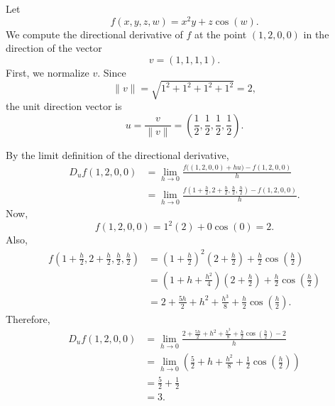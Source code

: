 	\begin{example}
	  \label{ex:directional-derivative-in-four-variables}
		Let
		\begin{equation}
			f(x,y,z,w) = x^2y + z\cos(w).
		\end{equation}
		We compute the directional derivative of $f$ at the point $(1,2,0,0)$ in the direction of the vector
		\begin{equation}
		  v=(1,1,1,1).
		\end{equation}
		First, we normalize $v$. Since
		\begin{equation}
			\|v\|
			=
			\sqrt{1^2+1^2+1^2+1^2}
			=
			2,
		\end{equation}
		the unit direction vector is
		\begin{equation}
			u = \frac{v}{\|v\|}
			=
			\left(\frac{1}{2}, \frac{1}{2}, \frac{1}{2}, \frac{1}{2}\right).
		\end{equation}

		By the limit definition of the directional derivative,
		\begin{align}
			D_u f(1,2,0,0)
			&=
			\lim_{h\to 0}
			\frac{f\big((1,2,0,0)+hu\big)-f(1,2,0,0)}{h} \\
			&=
			\lim_{h\to 0}
			\frac{
				f\left(1+\frac{h}{2}, 2+\frac{h}{2}, \frac{h}{2}, \frac{h}{2}\right)
				- f(1,2,0,0)
			}{h}.
		\end{align}
		Now,
		\begin{equation}
			f(1,2,0,0) = 1^2(2) + 0\cos(0) = 2.
		\end{equation}
		Also,
		\begin{align}
			f\left(1+\frac{h}{2}, 2+\frac{h}{2}, \frac{h}{2}, \frac{h}{2}\right)
			&=
			\left(1+\frac{h}{2}\right)^2
			\left(2+\frac{h}{2}\right)
			+
			\frac{h}{2}\cos\left(\frac{h}{2}\right) \\
			&=
			\left(1+h+\frac{h^2}{4}\right)
			\left(2+\frac{h}{2}\right)
			+
			\frac{h}{2}\cos\left(\frac{h}{2}\right) \\
			&=
			2 + \frac{5h}{2} + h^2 + \frac{h^3}{8}
			+
			\frac{h}{2}\cos\left(\frac{h}{2}\right).
		\end{align}
		Therefore,
		\begin{align}
			D_u f(1,2,0,0)
			&=
			\lim_{h\to 0}
			\frac{
				2 + \frac{5h}{2} + h^2 + \frac{h^3}{8}
				+
				\frac{h}{2}\cos\left(\frac{h}{2}\right)
				- 2
			}{h} \\
			&=
			\lim_{h\to 0}
			\left(
				\frac{5}{2}
				+
				h
				+
				\frac{h^2}{8}
				+
				\frac{1}{2}\cos\left(\frac{h}{2}\right)
			\right) \\
			&=
			\frac{5}{2} + \frac{1}{2} \\
			&=
			3.
		\end{align}
	\end{example}

